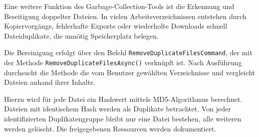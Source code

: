 

Eine weitere Funktion des Garbage-Collection-Tools ist die Erkennung und Beseitigung doppelter Dateien. In vielen Arbeitsverzeichnissen entstehen durch Kopiervorgänge, fehlerhafte Exporte oder wiederholte Downloads schnell Dateiduplikate, die unnötig Speicherplatz belegen.

Die Bereinigung erfolgt über den Befehl \texttt{RemoveDuplicateFilesCommand}, der mit der Methode \texttt{RemoveDuplicateFilesAsync()} verknüpft ist. Nach Ausführung durchsucht die Methode die vom Benutzer gewählten Verzeichnisse und vergleicht Dateien anhand ihrer Inhalte.

Hierzu wird für jede Datei ein Hashwert mittels MD5-Algorithmus berechnet. Dateien mit identischem Hash werden als Duplikate betrachtet. Von jeder identifizierten Duplikatengruppe bleibt nur eine Datei bestehen, alle weiteren werden gelöscht. Die freigegebenen Ressourcen werden dokumentiert.

